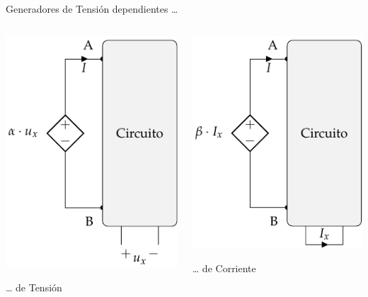 \documentclass[xcolor={usenames,svgnames,dvipsnames}]{beamer}
\begin{document}
\begin{frame}[label={sec:orga36758d}]{Generadores de Tensión dependientes \ldots{}}
\begin{columns}
\begin{column}{0.5\columnwidth}
  \begin{center}
\includegraphics[height=0.7\textheight]{figs/FuenteTensionDependienteTension.pdf}
\end{center}
\ldots{} de Tensión
\end{column}
\begin{column}{0.5\columnwidth}
  \begin{center}
\includegraphics[height=0.7\textheight]{figs/FuenteTensionDependienteCorriente.pdf}
\end{center}
\ldots{} de Corriente
\end{column}
\end{columns}
\end{frame}
\end{document}
